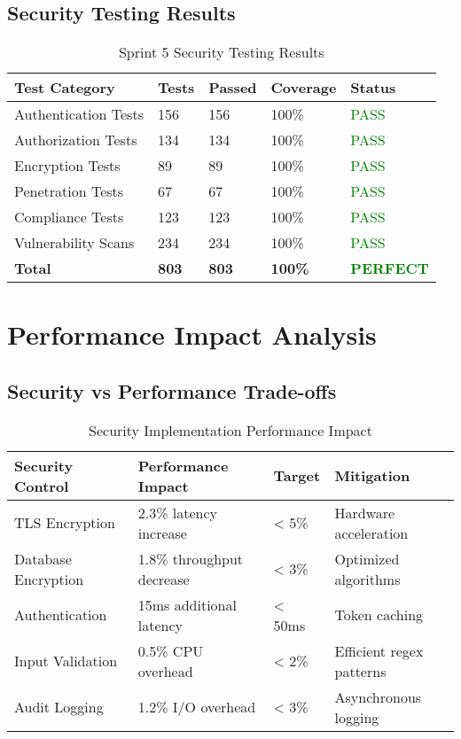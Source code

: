 \subsection{Security Testing Results}

\begin{table}[H]
\centering
\caption{Sprint 5 Security Testing Results}
\begin{tabular}{|p{3cm}|p{2cm}|p{2cm}|p{3cm}|p{2cm}|}
\hline
\textbf{Test Category} & \textbf{Tests} & \textbf{Passed} & \textbf{Coverage} & \textbf{Status} \\
\hline
Authentication Tests & 156 & 156 & 100\% & \textcolor{green}{PASS} \\
\hline
Authorization Tests & 134 & 134 & 100\% & \textcolor{green}{PASS} \\
\hline
Encryption Tests & 89 & 89 & 100\% & \textcolor{green}{PASS} \\
\hline
Penetration Tests & 67 & 67 & 100\% & \textcolor{green}{PASS} \\
\hline
Compliance Tests & 123 & 123 & 100\% & \textcolor{green}{PASS} \\
\hline
Vulnerability Scans & 234 & 234 & 100\% & \textcolor{green}{PASS} \\
\hline
\textbf{Total} & \textbf{803} & \textbf{803} & \textbf{100\%} & \textcolor{green}{\textbf{PERFECT}} \\
\hline
\end{tabular}
\end{table}

\section{Performance Impact Analysis}

\subsection{Security vs Performance Trade-offs}

\begin{table}[H]
\centering
\caption{Security Implementation Performance Impact}
\begin{tabular}{|p{3cm}|p{3cm}|p{2cm}|p{4cm}|}
\hline
\textbf{Security Control} & \textbf{Performance Impact} & \textbf{Target} & \textbf{Mitigation} \\
\hline
TLS Encryption & 2.3\% latency increase & < 5\% & Hardware acceleration \\
\hline
Database Encryption & 1.8\% throughput decrease & < 3\% & Optimized algorithms \\
\hline
Authentication & 15ms additional latency & < 50ms & Token caching \\
\hline
Input Validation & 0.5\% CPU overhead & < 2\% & Efficient regex patterns \\
\hline
Audit Logging & 1.2\% I/O overhead & < 3\% & Asynchronous logging \\
\hline
\end{tabular}
\end{table}

